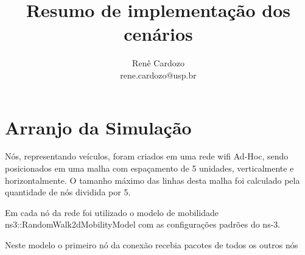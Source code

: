 \documentclass{article}
\author{Renê Cardozo \\ 
        rene.cardozo@usp.br}
\title{Resumo de implementação dos cenários}
\date{}
\begin{document}
\maketitle

\section{Arranjo da Simulação}
Nós, representando veículos, foram criados em uma rede wifi Ad-Hoc, sendo posicionados em uma malha com espaçamento de 5
unidades, verticalmente e horizontalmente. O tamanho máximo das linhas desta malha foi calculado pela quantidade de nós dividida
por 5.

Em cada nó da rede foi utilizado o modelo de mobilidade ns3::RandomWalk2dMobilityModel com as configurações padrões do
ns-3.

Neste modelo o primeiro nó da conexão recebia pacotes de todos os outros nós    
\end{document}

